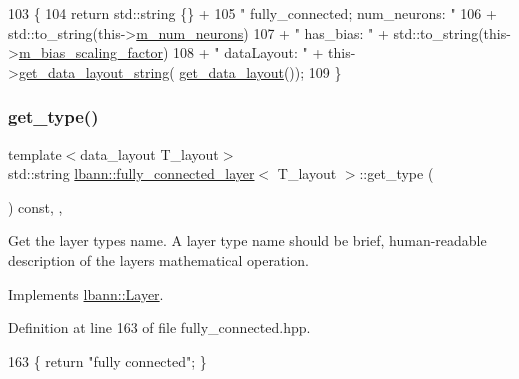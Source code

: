 \begin{DoxyCode}
103                                              \{
104     \textcolor{keywordflow}{return} std::string \{\} +
105      \textcolor{stringliteral}{" fully\_connected; num\_neurons: "}
106      + std::to\_string(this->\hyperlink{classlbann_1_1Layer_a6b5ebc8a7d9329d8a773ed787e7b41d8}{m\_num\_neurons})
107      + \textcolor{stringliteral}{" has\_bias: "} + std::to\_string(this->\hyperlink{classlbann_1_1fully__connected__layer_ae02eaffd5528bf572883f8b06d1b40c0}{m\_bias\_scaling\_factor})
108      + \textcolor{stringliteral}{" dataLayout: "} + this->\hyperlink{classlbann_1_1Layer_ae3f4a5602df821f4221614b1e3782dc1}{get\_data\_layout\_string}(
      \hyperlink{classlbann_1_1fully__connected__layer_a0d84bbfa7df80e879da13f54d465a603}{get\_data\_layout}());
109   \}
\end{DoxyCode}
\mbox{\label{classlbann_1_1fully__connected__layer_abd51271a19a8cce44ba4f2d11eaaaee7}} 
\subsubsection{\texorpdfstring{get\+\_\+type()}{get\_type()}}
{\footnotesize\ttfamily template$<$data\+\_\+layout T\+\_\+layout$>$ \\
std\+::string \hyperlink{classlbann_1_1fully__connected__layer}{lbann\+::fully\+\_\+connected\+\_\+layer}$<$ T\+\_\+layout $>$\+::get\+\_\+type (\begin{DoxyParamCaption}{ }\end{DoxyParamCaption}) const\hspace{0.3cm}{\ttfamily [inline]}, {\ttfamily [override]}, {\ttfamily [virtual]}}

Get the layer type\textquotesingle{}s name. A layer type name should be brief, human-\/readable description of the layer\textquotesingle{}s mathematical operation. 

Implements \hyperlink{classlbann_1_1Layer_a0fa0ea9160b490c151c0a17fde4f7239}{lbann\+::\+Layer}.



Definition at line 163 of file fully\+\_\+connected.\+hpp.


\begin{DoxyCode}
163 \{ \textcolor{keywordflow}{return} \textcolor{stringliteral}{"fully connected"}; \}
\end{DoxyCode}
\mbox{\label{classlbann_1_1fully__connected__layer_ab06d01021d4e89cd2f4f64c330e7cc31}} 

